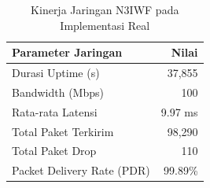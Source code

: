 \begin{table}[h!]
\centering
\caption{Kinerja Jaringan N3IWF pada Implementasi Real}
\label{tab:network_n3iwf}
\begin{tabular}{lr}
\hline
\textbf{Parameter Jaringan} & \textbf{Nilai} \\
\hline
Durasi Uptime (s) & 37,855 \\
Bandwidth (Mbps) & 100 \\
Rata-rata Latensi & 9.97 ms \\
Total Paket Terkirim & 98,290 \\
Total Paket Drop & 110 \\
Packet Delivery Rate (PDR) & 99.89\% \\
\hline
\end{tabular}
\end{table}
